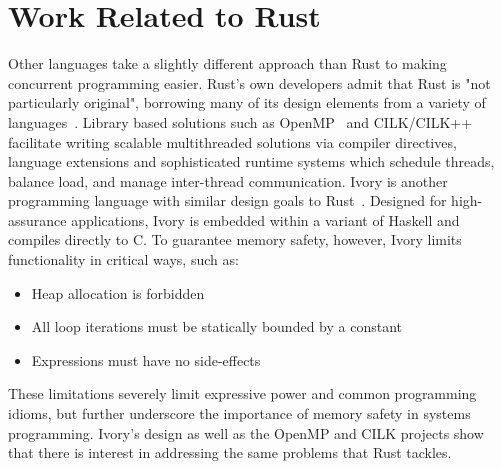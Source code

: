 \section{Work Related to Rust}\label{sec::relatedwork}
Other languages take a slightly different approach than Rust to making concurrent programming easier. Rust's own developers admit that Rust is "not particularly original", borrowing many of its design elements from a variety of languages~\cite{rust-influences}. Library based solutions such as OpenMP~\cite{openmp} and CILK/CILK++~\cite{cilk} facilitate writing scalable multithreaded solutions via compiler directives, language extensions and sophisticated runtime systems which schedule threads, balance load, and manage inter-thread communication. Ivory is another programming language with similar design goals to Rust~\cite{ivory}. Designed for high-assurance applications, Ivory is embedded within a variant of Haskell and compiles directly to C. To guarantee memory safety, however, Ivory limits functionality in critical ways, such as:
\begin{itemize}
\item Heap allocation is forbidden
\item All loop iterations must be statically bounded by a constant
\item Expressions must have no side-effects
\end{itemize}
These limitations severely limit expressive power and common programming idioms, but further underscore the importance of memory safety in systems programming. Ivory's design as well as the OpenMP and CILK projects show that there is interest in addressing the same problems that Rust tackles.